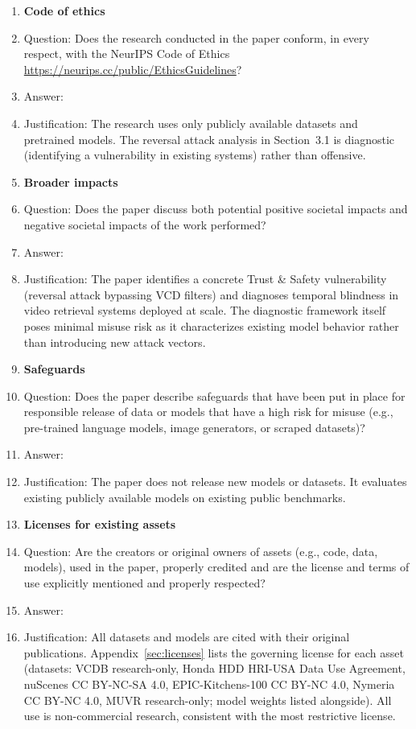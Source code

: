 \begin{enumerate}
\item {\bf Code of ethics}
    \item[] Question: Does the research conducted in the paper conform, in every respect, with the NeurIPS Code of Ethics \url{https://neurips.cc/public/EthicsGuidelines}?
    \item[] Answer: \answerYes{}
    \item[] Justification: The research uses only publicly available datasets and pretrained models. The reversal attack analysis in Section~3.1 is diagnostic (identifying a vulnerability in existing systems) rather than offensive.

\item {\bf Broader impacts}
    \item[] Question: Does the paper discuss both potential positive societal impacts and negative societal impacts of the work performed?
    \item[] Answer: \answerYes{}
    \item[] Justification: The paper identifies a concrete Trust \& Safety vulnerability (reversal attack bypassing VCD filters) and diagnoses temporal blindness in video retrieval systems deployed at scale. The diagnostic framework itself poses minimal misuse risk as it characterizes existing model behavior rather than introducing new attack vectors.

\item {\bf Safeguards}
    \item[] Question: Does the paper describe safeguards that have been put in place for responsible release of data or models that have a high risk for misuse (e.g., pre-trained language models, image generators, or scraped datasets)?
    \item[] Answer: \answerNA{}
    \item[] Justification: The paper does not release new models or datasets. It evaluates existing publicly available models on existing public benchmarks.

\item {\bf Licenses for existing assets}
    \item[] Question: Are the creators or original owners of assets (e.g., code, data, models), used in the paper, properly credited and are the license and terms of use explicitly mentioned and properly respected?
    \item[] Answer: \answerYes{}
    \item[] Justification: All datasets and models are cited with their original publications. Appendix~\ref{sec:licenses} lists the governing license for each asset (datasets: VCDB research-only, Honda HDD HRI-USA Data Use Agreement, nuScenes CC BY-NC-SA 4.0, EPIC-Kitchens-100 CC BY-NC 4.0, Nymeria CC BY-NC 4.0, MUVR research-only; model weights listed alongside). All use is non-commercial research, consistent with the most restrictive license.


\end{enumerate}
